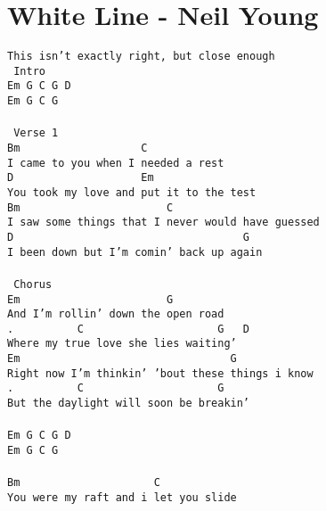 \newpage
\section{White Line - Neil Young}
\label{White Line - Neil Young}
\texttt{This isn't exactly right, but close enough\\
\lbrack\ Intro\rbrack\\
Em\ G\ C\ G\ D\\
Em\ G\ C\ G\\
\\
\lbrack\ Verse\ 1\rbrack\\
Bm\ \ \ \ \ \ \ \ \ \ \ \ \ \ \ \ \ \ \ C\\
I\ came\ to\ you\ when\ I\ needed\ a\ rest\\
D\ \ \ \ \ \ \ \ \ \ \ \ \ \ \ \ \ \ \ \ Em\\
You\ took\ my\ love\ and\ put\ it\ to\ the\ test\\
Bm\ \ \ \ \ \ \ \ \ \ \ \ \ \ \ \ \ \ \ \ \ \ \ C\\
I\ saw\ some\ things\ that\ I\ never\ would\ have\ guessed\\
D\ \ \ \ \ \ \ \ \ \ \ \ \ \ \ \ \ \ \ \ \ \ \ \ \ \ \ \ \ \ \ \ \ \ \ \ G\\
I\ been\ down\ but\ I'm\ comin'\ back\ up\ again\\
\\
\lbrack\ Chorus\rbrack\\
Em\ \ \ \ \ \ \ \ \ \ \ \ \ \ \ \ \ \ \ \ \ \ \ G\\
And\ I'm\ rollin'\ down\ the\ open\ road\\
. \ \ \ \ \ \ \ \ \ C\ \ \ \ \ \ \ \ \ \ \ \ \ \ \ \ \ \ \ \ \ G\ \ \ D\\
Where\ my\ true\ love\ she\ lies\ waiting'\\
Em\ \ \ \ \ \ \ \ \ \ \ \ \ \ \ \ \ \ \ \ \ \ \ \ \ \ \ \ \ \ \ \ \ G\\
Right\ now\ I'm\ thinkin'\ 'bout\ these\ things\ i\ know\\
. \ \ \ \ \ \ \ \ \ C\ \ \ \ \ \ \ \ \ \ \ \ \ \ \ \ \ \ \ \ \ G\ \ \\
But\ the\ daylight\ will\ soon\ be\ breakin'\\
\\
Em\ G\ C\ G\ D\\
Em\ G\ C\ G\\
\\
Bm\ \ \ \ \ \ \ \ \ \ \ \ \ \ \ \ \ \ \ \ \ C\\
You\ were\ my\ raft\ and\ i\ let\ you\ slide\\
}
